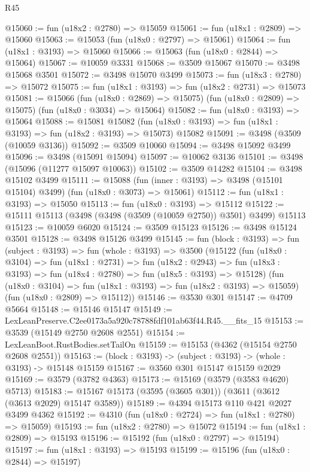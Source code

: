 \begin{lexlean}{R45}
\begin{coremodule}
@15060 := fun (u18x2 : @2780) => @15059
@15061 := fun (u18x1 : @2809) => @15060
@15063 := @15053 (fun (u18x0 : @2797) => @15061)
@15064 := fun (u18x1 : @3193) => @15060
@15066 := @15063 (fun (u18x0 : @2844) => @15064)
@15067 := @10059 @3331
@15068 := @3509 @15067
@15070 := @3498 @15068 @3501
@15072 := @3498 @15070 @3499
@15073 := fun (u18x3 : @2780) => @15072
@15075 := fun (u18x1 : @3193) => fun (u18x2 : @2731) => @15073
@15081 := @15066
    (fun (u18x0 : @2869) => @15075)
    (fun (u18x0 : @2809) => @15075)
    (fun (u18x0 : @3034) => @15064)
@15082 := fun (u18x0 : @3193) => @15064
@15088 := @15081
    @15082
    (fun (u18x0 : @3193) => fun (u18x1 : @3193) => fun (u18x2 : @3193) => @15073)
    @15082
@15091 := @3498 (@3509 (@10059 @3136))
@15092 := @3509 @10060
@15094 := @3498 @15092 @3499
@15096 := @3498 (@15091 @15094)
@15097 := @10062 @3136
@15101 := @3498 (@15096 (@11277 @15097 @10063))
@15102 := @3509 @14282
@15104 := @3498 @15102 @3499
@15111 := @15088
    (fun (inner : @3193) => @3498 (@15101 @15104) @3499)
    (fun (u18x0 : @3073) => @15061)
@15112 := fun (u18x1 : @3193) => @15050
@15113 := fun (u18x0 : @3193) => @15112
@15122 := @15111 @15113 (@3498 (@3498 (@3509 (@10059 @2750)) @3501) @3499) @15113
@15123 := @10059 @6020
@15124 := @3509 @15123
@15126 := @3498 @15124 @3501
@15128 := @3498 @15126 @3499
@15145 := fun (block : @3193) =>
  fun (subject : @3193) =>
  fun (whole : @3193) =>
  @3500
    (@15122
      (fun (u18x0 : @3104) =>
      fun (u18x1 : @2731) =>
      fun (u18x2 : @2943) =>
      fun (u18x3 : @3193) => fun (u18x4 : @2780) => fun (u18x5 : @3193) => @15128)
      (fun (u18x0 : @3104) => fun (u18x1 : @3193) => fun (u18x2 : @3193) => @15059)
      (fun (u18x0 : @2809) => @15112))
@15146 := @3530 @301
@15147 := @4709 @5664
@15148 := @15146 @15147
@15149 := LexLeanPreserve.C2ee0173a5a920c78788fdf101ab63f44.R45.__fits_15
@15153 := @3539 (@15149 @2750 @2608 @2551)
@15154 := LexLeanBoot.RustBodies.setTailOn
@15159 := @15153 (@4362 (@15154 @2750 @2608 @2551))
@15163 := (block : @3193) -> (subject : @3193) -> (whole : @3193) -> @15148 @15159
@15167 := @3560 @301 @15147 @15159 @2029
@15169 := @3579 (@3782 @4363)
@15173 := @15169 (@3579 (@3583 @4620) @5713)
@15183 := @15167 @15173 (@3595 (@3605 @301)) (@3611 (@3612 (@3613 @2029) @15147 @3589))
@15189 := @4394 @15173 @110 @421 @2027 @3499 @4362
@15192 := @4310 (fun (u18x0 : @2724) => fun (u18x1 : @2780) => @15059)
@15193 := fun (u18x2 : @2780) => @15072
@15194 := fun (u18x1 : @2809) => @15193
@15196 := @15192 (fun (u18x0 : @2797) => @15194)
@15197 := fun (u18x1 : @3193) => @15193
@15199 := @15196 (fun (u18x0 : @2844) => @15197)

\end{coremodule}
\end{lexlean}
